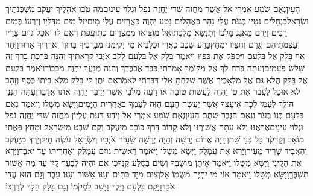 \documentclass[../main/main.tex]{subfiles}
\begin{document}
\begin{multicols}{\ncols}
הָעָיִן\PreVerseSpace{}נְאֻם שֹׁמֵעַ אִמְרֵי אֵל אֲשֶׁר מַחֲזֵה שַׁדַּי יֶחֱזֶה נֹפֵל וּגְלוּי עֵינָיִם\PreVerseSpace{}מַה טֹּבוּ אֹהָלֶיךָ יַעֲקֹב מִשְׁכְּנֹתֶיךָ יִשְׂרָאֵל\PreVerseSpace{}כִּנְחָלִים נִטָּיוּ כְּגַנֹּת עֲלֵי נָהָר כַּאֲהָלִים נָטַע יַהְוֶה כַּאֲרָזִים עֲלֵי מָיִם\PreVerseSpace{}יִזַּל מַיִם מִדָּלְיָו וְזַרְעוֹ בְּמַיִם רַבִּים וְיָרֹם מֵאֲגַג מַלְכּוֹ וְתִנַּשֵּׂא מַלְכֻתוֹ\PreVerseSpace{}אֵל מוֹצִיאוֹ מִמִּצְרַיִם כְּתוֹעֲפֹת רְאֵם לוֹ יֹאכַל גּוֹיִם צָרָיו וְעַצְמֹתֵיהֶם יְגָרֵם וְחִצָּיו יִמְחָץ\PreVerseSpace{}כָּרַע שָׁכַב כַּאֲרִי וּכְלָבִיא מִי יְקִימֶנּוּ מְבָרֲכֶיךָ בָרוּךְ וְאֹרְרֶיךָ אָרוּר\PreVerseSpace{}וַיִּחַר אַף בָּלָק אֶל בִּלְעָם וַיִּסְפֹּק אֶת כַּפָּיו וַיֹּאמֶר בָּלָק אֶל בִּלְעָם לָקֹב אֹיְבַי קְרָאתִיךָ וְהִנֵּה בֵּרַכְתָּ בָרֵךְ זֶה שָׁלֹשׁ פְּעָמִים\PreVerseSpace{}וְעַתָּה בְּרַח לְךָ אֶל מְקוֹמֶךָ אָמַרְתִּי כַּבֵּד אֲכַבֶּדְךָ וְהִנֵּה מְנָעֲךָ יַהְוֶה מִכָּבוֹד\PreVerseSpace{}וַיֹּאמֶר בִּלְעָם אֶל בָּלָק הֲלֹא גַּם אֶל מַלְאָכֶיךָ אֲשֶׁר שָׁלַחְתָּ אֵלַי דִּבַּרְתִּי לֵאמֹר\PreVerseSpace{}אִם יִתֶּן לִי בָלָק מְלֹא בֵיתוֹ כֶּסֶף וְזָהָב לֹא אוּכַל לַעֲבֹר אֶת פִּי יַהְוֶה לַעֲשׂוֹת טוֹבָה אוֹ רָעָה מִלִּבִּי אֲשֶׁר יְדַבֵּר יַהְוֶה אֹתוֹ אֲדַבֵּר\PreVerseSpace{}וְעַתָּה הִנְנִי הוֹלֵךְ לְעַמִּי לְכָה אִיעָצְךָ אֲשֶׁר יַעֲשֶׂה הָעָם הַזֶּה לְעַמְּךָ בְּאַחֲרִית הַיָּמִים\PreVerseSpace{}וַיִּשָּׂא מְשָׁלוֹ וַיֹּאמַר נְאֻם בִּלְעָם בְּנוֹ בְעֹר וּנְאֻם הַגֶּבֶר שְׁתֻם הָעָיִן\PreVerseSpace{}נְאֻם שֹׁמֵעַ אִמְרֵי אֵל וְיֹדֵעַ דַּעַת עֶלְיוֹן מַחֲזֵה שַׁדַּי יֶחֱזֶה נֹפֵל וּגְלוּי עֵינָיִם\PreVerseSpace{}אֶרְאֶנּוּ וְלֹא עַתָּה אֲשׁוּרֶנּוּ וְלֹא קָרוֹב דָּרַךְ כּוֹכָב מִיַּעֲקֹב וְקָם שֵׁבֶט מִיִּשְׂרָאֵל וּמָחַץ פַּאֲתֵי מוֹאָב וְקָדְקֹד\SubEnd{} כָּל בְּנֵי שֵׁת\PreVerseSpace{}וְהָיָה אֱדוֹם יְרֵשָׁה וְהָיָה יְרֵשָׁה שֵׂעִיר אֹיְבָיו וְיִשְׂרָאֵל עֹשֶׂה חָיִל\PreVerseSpace{}וְיֵרְדְּ מִיַּעֲקֹב וְהֶאֱבִיד שָׂרִיד מֵעִיר\PreVerseSpace{}וַיַּרְא אֶת עֲמָלֵק וַיִּשָּׂא מְשָׁלוֹ וַיֹּאמַר רֵאשִׁית גּוֹיִם עֲמָלֵק וְאַחֲרִיתוֹ עַד יֹאבֵד\SubEnd{}\PreVerseSpace{}וַיַּרְא אֶת הַקֵּינִי וַיִּשָּׂא מְשָׁלוֹ וַיֹּאמַר אֵיתָן מוֹשָׁבֶךָ וְשִׂים בַּסֶּלַע קִנֶּךָ\PreVerseSpace{}כִּי אִם יִהְיֶה לְבָעֵר קָיִן עַד מָה אַשּׁוּר תִּשְׁבֶּךָּ\PreVerseSpace{}וַיִּשָּׂא מְשָׁלוֹ וַיֹּאמַר אוֹי מִי יִחְיֶה מִשֻּׂמוֹ אֵל\PreVerseSpace{}וְצִים מִיַּד כִּתִּים וְעִנּוּ אַשּׁוּר וְעִנּוּ עֵבֶר וְגַם הוּא עֲדֵי אֹבֵד\PreVerseSpace{}וַיָּקָם בִּלְעָם וַיֵּלֶךְ וַיָּשָׁב לִמְקֹמוֹ וְגַם בָּלָק הָלַךְ לְדַרְכּוֹ\OpenSection{}\par

\end{multicols}
\end{document}

